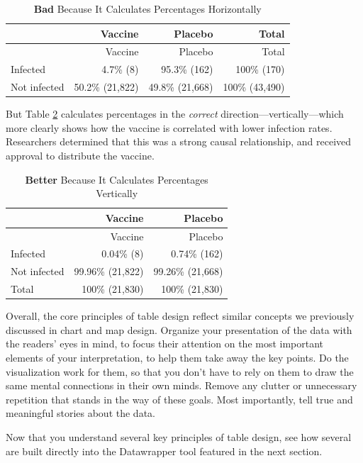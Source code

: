 \documentclass[
  english,
]{book}
\begin{document}
\begin{longtable}[]{@{}lrrr@{}}
\caption{\label{tab:vaccine-bad} \textbf{Bad} Because It Calculates Percentages Horizontally}\tabularnewline
\toprule
& Vaccine & Placebo & Total \\
\midrule
\endfirsthead
\toprule
& Vaccine & Placebo & Total \\
\midrule
\endhead
Infected & 4.7\% (8) & 95.3\% (162) & 100\% (170) \\
Not infected & 50.2\% (21,822) & 49.8\% (21,668) & 100\% (43,490) \\
\bottomrule
\end{longtable}

But Table \ref{tab:vaccine-better} calculates percentages in the \emph{correct} direction---vertically---which more clearly shows how the vaccine is correlated with lower infection rates. Researchers determined that this was a strong causal relationship, and received approval to distribute the vaccine.

\begin{longtable}[]{@{}lrr@{}}
\caption{\label{tab:vaccine-better} \textbf{Better} Because It Calculates Percentages Vertically}\tabularnewline
\toprule
& Vaccine & Placebo \\
\midrule
\endfirsthead
\toprule
& Vaccine & Placebo \\
\midrule
\endhead
Infected & 0.04\% (8) & 0.74\% (162) \\
Not infected & 99.96\% (21,822) & 99.26\% (21,668) \\
Total & 100\% (21,830) & 100\% (21,830) \\
\bottomrule
\end{longtable}

Overall, the core principles of table design reflect similar concepts we previously discussed in chart and map design. Organize your presentation of the data with the readers' eyes in mind, to focus their attention on the most important elements of your interpretation, to help them take away the key points. Do the visualization work for them, so that you don't have to rely on them to draw the same mental connections in their own minds. Remove any clutter or unnecessary repetition that stands in the way of these goals. Most importantly, tell true and meaningful stories about the data.

Now that you understand several key principles of table design, see how several are built directly into the Datawrapper tool featured in the next section.
\end{document}
